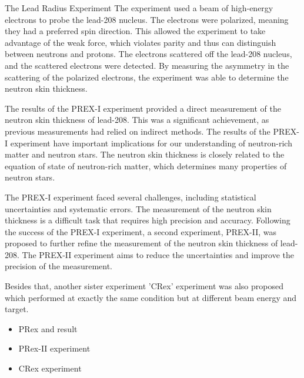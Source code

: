 The Lead Radius Experiment The experiment used a beam of high-energy electrons to probe the lead-208 nucleus. The electrons were polarized, meaning they had a preferred spin direction. This allowed the experiment to take advantage of the weak force, which violates parity and thus can distinguish between neutrons and protons. The electrons scattered off the lead-208 nucleus, and the scattered electrons were detected. By measuring the asymmetry in the scattering of the polarized electrons, the experiment was able to determine the neutron skin thickness.

The results of the PREX-I experiment provided a direct measurement of the neutron skin thickness of lead-208. This was a significant achievement, as previous measurements had relied on indirect methods. The results of the PREX-I experiment have important implications for our understanding of neutron-rich matter and neutron stars. The neutron skin thickness is closely related to the equation of state of neutron-rich matter, which determines many properties of neutron stars.

The PREX-I experiment faced several challenges, including statistical uncertainties and systematic errors. The measurement of the neutron skin thickness is a difficult task that requires high precision and accuracy.  Following the success of the PREX-I experiment, a second experiment, PREX-II, was proposed to further refine the measurement of the neutron skin thickness of lead-208. The PREX-II experiment aims to reduce the uncertainties and improve the precision of the measurement.

Besides that, another sister experiment 'CRex' experiment was also proposed which performed at exactly the same condition but at different beam energy and target. 

\begin{itemize}
    \item PRex and result
\end{itemize}

\begin{itemize}
    \item PRex-II experiment 
\end{itemize}

\begin{itemize}
    \item CRex experiment
\end{itemize}